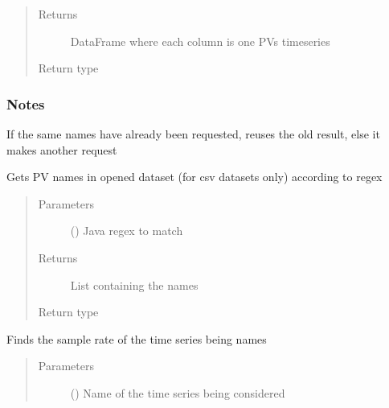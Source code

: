 \documentclass[letterpaper,10pt,english]{sphinxmanual}
\begin{document}
\begin{fulllineitems}
\begin{fulllineitems}
\begin{quote}
\begin{description}
\item[{Returns}] \leavevmode
\sphinxAtStartPar
DataFrame where each column is one PVs timeseries

\item[{Return type}] \leavevmode
\sphinxAtStartPar
{}

\end{description}\end{quote}
\subsubsection*{Notes}

\sphinxAtStartPar
If the same names have already been requested, reuses the old result, else it makes another request

\end{fulllineitems}


\begin{fulllineitems}
\label{\detokenize{dataset:dataset.Dataset.get_columns}}
\sphinxAtStartPar
Gets PV names in opened dataset (for csv datasets only) according to regex
\begin{quote}\begin{description}
\item[{Parameters}] \leavevmode
\sphinxAtStartPar
{} () \textendash{} Java regex to match

\item[{Returns}] \leavevmode
\sphinxAtStartPar
List containing the names

\item[{Return type}] \leavevmode
\sphinxAtStartPar
{}

\end{description}\end{quote}

\end{fulllineitems}


\begin{fulllineitems}
\label{\detokenize{dataset:dataset.Dataset.get_fs}}
\sphinxAtStartPar
Finds the sample rate of the time series being names
\begin{quote}\begin{description}
\item[{Parameters}] \leavevmode
\sphinxAtStartPar
{} () \textendash{} Name of the time series being considered


\end{description}
\end{quote}
\end{fulllineitems}
\end{fulllineitems}
\end{document}
